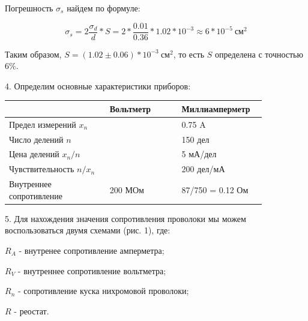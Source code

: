 \documentclass[14pt]{article}
\begin{document}
	Погрешность $\sigma_s$ найдем по формуле:
	
	$$\sigma_s = 2\frac{\sigma_d}{d}*S = 2*\frac{0.01}{0.36}*1.02*10^{-3} \approx 6*10^{-5}~\text{см}^2$$
	
	Таким образом, $S = (1.02 \pm 0.06)*10^{-3}~\text{см}^2$, то есть $S$ определена с точностью 6\%.
	
	\vspace{0.5cm}
	4. Определим основные характеристики приборов:
	
	\begin{center}
	\begin{tabular}{|p{0.35\linewidth}|p{0.25\linewidth}|p{0.25\linewidth}|}
	\hline
								& Вольтметр 		& Миллиамперметр\\
	\hline
	Предел измерений $x_n$ 		& 					& 0.75 A\\
	\hline
	Число делений $n$			& 					& 150 дел\\
	\hline
	Цена делений $x_n/n$		&					& 5 мА/дел\\
	\hline
	Чувствительность $n/x_n$	&					& 200 дел/мА\\
	\hline
	Внутреннее сопротивление	& 200 МОм			& 87/750 = 0.12 Ом\\
	\hline	
	\end{tabular}
	\end{center}

	\vspace{1cm}
	5. Для нахождения значения сопротивления проволоки мы можем воспользоваться двумя схемами (рис. 1), где:
	
	\vspace*{0.3cm}
	$R_A$ - внутренее сопротивление амперметра;
	
	$R_V$ - внутреннее сопротивление вольтметра;
	
	$R_n$ - сопротивление куска нихромовой проволоки;
	
	$R$ - реостат.
\end{document}

